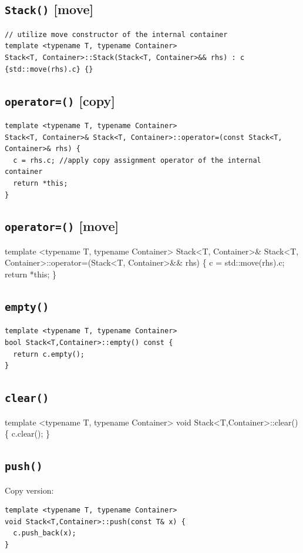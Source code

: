 \documentclass[12pt]{book}
\begin{document}
\subsection{\texttt{Stack()} [move]}
\label{sec:org3b7fd29}
\begin{verbatim}
// utilize move constructor of the internal container
template <typename T, typename Container>
Stack<T, Container>::Stack(Stack<T, Container>&& rhs) : c {std::move(rhs).c} {}
\end{verbatim}
\subsection{\texttt{operator=()} [copy]}
\label{sec:org3463465}
\begin{verbatim}
template <typename T, typename Container>
Stack<T, Container>& Stack<T, Container>::operator=(const Stack<T, Container>& rhs) {
  c = rhs.c; //apply copy assignment operator of the internal container
  return *this;
}
\end{verbatim}
\subsection{\texttt{operator=()} [move]}
\label{sec:org25bb810}
template <typename T, typename Container>
Stack<T, Container>\& Stack<T, Container>::operator=(Stack<T, Container>\&\& rhs) \{
  c = std::move(rhs).c;
  return *this;
\}
\subsection{\texttt{empty()}}
\label{sec:orge8d37aa}
\begin{verbatim}
template <typename T, typename Container>
bool Stack<T,Container>::empty() const {
  return c.empty();
}
\end{verbatim}
\subsection{\texttt{clear()}}
\label{sec:orgd02f210}
template <typename T, typename Container>
void Stack<T,Container>::clear() \{
  c.clear();
\}
\subsection{\texttt{push()}}
\label{sec:org63f0843}
Copy version:
\begin{verbatim}
template <typename T, typename Container>
void Stack<T,Container>::push(const T& x) {
  c.push_back(x);
}
\end{verbatim}
\end{document}
